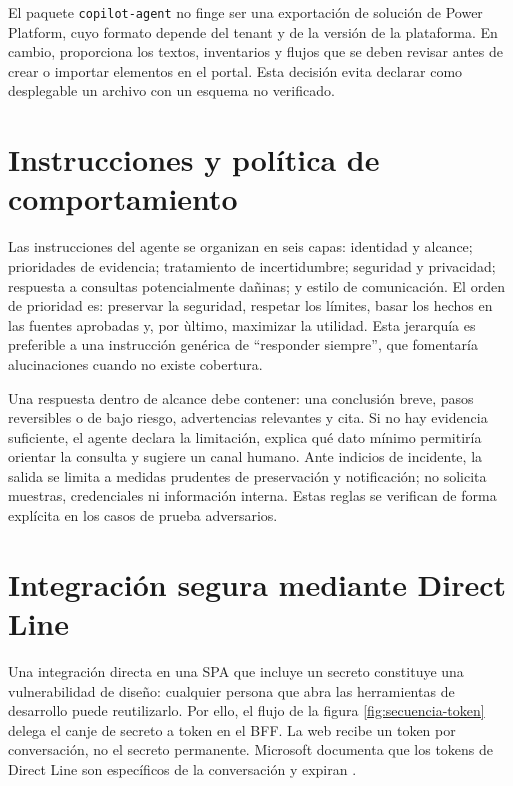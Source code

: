 El paquete \texttt{copilot-agent} no finge ser una exportaci\'on de soluci\'on de Power Platform, cuyo formato depende del tenant y de la versi\'on de la plataforma. En cambio, proporciona los textos, inventarios y flujos que se deben revisar antes de crear o importar elementos en el portal. Esta decisi\'on evita declarar como desplegable un archivo con un esquema no verificado.

\section{Instrucciones y pol\'itica de comportamiento}

Las instrucciones del agente se organizan en seis capas: identidad y alcance; prioridades de evidencia; tratamiento de incertidumbre; seguridad y privacidad; respuesta a consultas potencialmente da\~ninas; y estilo de comunicaci\'on. El orden de prioridad es: preservar la seguridad, respetar los l\'imites, basar los hechos en las fuentes aprobadas y, por \`ultimo, maximizar la utilidad. Esta jerarqu\'ia es preferible a una instrucci\'on gen\'erica de ``responder siempre'', que fomentar\'ia alucinaciones cuando no existe cobertura.

Una respuesta dentro de alcance debe contener: una conclusi\'on breve, pasos reversibles o de bajo riesgo, advertencias relevantes y cita. Si no hay evidencia suficiente, el agente declara la limitaci\'on, explica qu\'e dato m\'inimo permitir\'ia orientar la consulta y sugiere un canal humano. Ante indicios de incidente, la salida se limita a medidas prudentes de preservaci\'on y notificaci\'on; no solicita muestras, credenciales ni informaci\'on interna. Estas reglas se verifican de forma expl\'icita en los casos de prueba adversarios.

\section{Integraci\'on segura mediante Direct Line}

Una integraci\'on directa en una SPA que incluye un secreto constituye una vulnerabilidad de dise\~no: cualquier persona que abra las herramientas de desarrollo puede reutilizarlo. Por ello, el flujo de la figura \ref{fig:secuencia-token} delega el canje de secreto a token en el BFF. La web recibe un token por conversaci\'on, no el secreto permanente. Microsoft documenta que los tokens de Direct Line son espec\'ificos de la conversaci\'on y expiran \cite{copilotDirectLine}.

